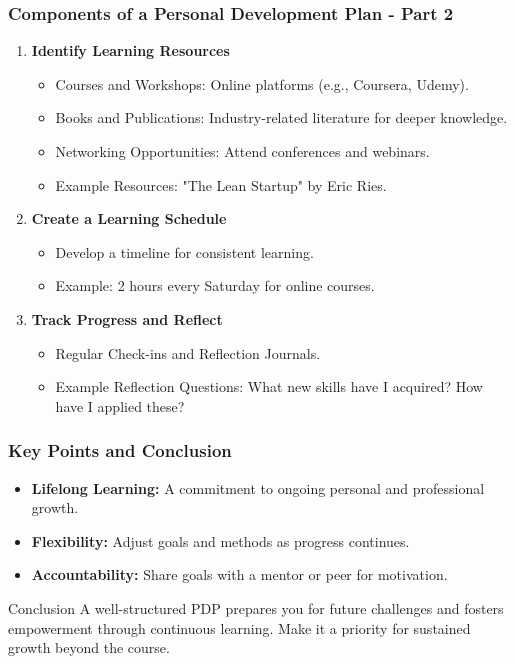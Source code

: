 \documentclass[aspectratio=169]{beamer}
\begin{document}
\begin{frame}[fragile]
    \frametitle{Components of a Personal Development Plan - Part 2}
    \begin{enumerate}[resume]
        \item \textbf{Identify Learning Resources}
            \begin{itemize}
                \item Courses and Workshops: Online platforms (e.g., Coursera, Udemy).
                \item Books and Publications: Industry-related literature for deeper knowledge.
                \item Networking Opportunities: Attend conferences and webinars.
                \item Example Resources: "The Lean Startup" by Eric Ries.
            \end{itemize}
        \item \textbf{Create a Learning Schedule}
            \begin{itemize}
                \item Develop a timeline for consistent learning.
                \item Example: 2 hours every Saturday for online courses.
            \end{itemize}
        \item \textbf{Track Progress and Reflect}
            \begin{itemize}
                \item Regular Check-ins and Reflection Journals.
                \item Example Reflection Questions: What new skills have I acquired? How have I applied these?
            \end{itemize}
    \end{enumerate}
\end{frame}

\begin{frame}[fragile]
    \frametitle{Key Points and Conclusion}
    \begin{itemize}
        \item \textbf{Lifelong Learning:} A commitment to ongoing personal and professional growth.
        \item \textbf{Flexibility:} Adjust goals and methods as progress continues.
        \item \textbf{Accountability:} Share goals with a mentor or peer for motivation.
    \end{itemize}
    
    \begin{block}{Conclusion}
        A well-structured PDP prepares you for future challenges and fosters empowerment through continuous learning. Make it a priority for sustained growth beyond the course.
    \end{block}
\end{frame}
\end{document}
